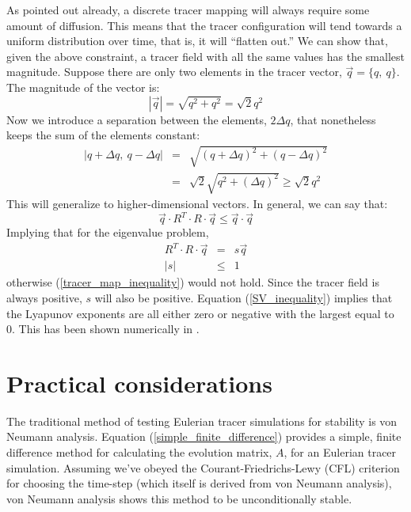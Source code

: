 \documentclass[11pt]{article}
\begin{document}
As pointed out already, a discrete tracer mapping will always require some 
amount of diffusion.  This means that the tracer configuration will 
tend towards a uniform distribution over time, 
that is, it will ``flatten out.''  We can
show that, given the above constraint, a tracer field with all the same values
 has the smallest magnitude.  Suppose there are only two elements in the 
tracer vector, $\vec q=\lbrace q,~q \rbrace$.  The magnitude of the vector is:
\begin{equation}
|\vec q|=\sqrt{q^2+q^2}=\sqrt{2} q^2
\end{equation}
Now we introduce a separation between the elements, $2\Delta q$, that 
nonetheless keeps the sum of the elements constant:
\begin{eqnarray}
|q+\Delta q,~q-\Delta q| & = & \sqrt{(q+\Delta q)^2+(q-\Delta q)^2} \\
& = & \sqrt{2}\sqrt{q^2+(\Delta q)^2} \ge \sqrt{2} q^2
\end{eqnarray}
This will generalize to higher-dimensional vectors.  In general, we can
say that:
\begin{equation}
\vec q \cdot R^T \cdot R \cdot \vec q \le \vec q \cdot \vec q
\label{tracer_map_inequality}
\end{equation}
Implying that for the eigenvalue problem,
\begin{eqnarray}
R^T \cdot R \cdot \vec q & = & s \vec q \nonumber\\
|s| & \le & 1 \label{SV_inequality}
\end{eqnarray}
otherwise (\ref{tracer_map_inequality}) would not hold.
Since the tracer field is always positive, $s$ will also be positive.
Equation (\ref{SV_inequality}) implies that the Lyapunov exponents are all
either zero or negative with the largest equal to 0.  This has been shown
numerically in \citet{Mills2012}.

\section{Practical considerations}

The traditional method of testing Eulerian tracer simulations for stability
is von Neumann analysis.
Equation (\ref{simple_finite_difference}) provides a simple, finite
difference method for
calculating the evolution matrix, $A$, for an Eulerian tracer simulation.
Assuming we've obeyed the Courant-Friedrichs-Lewy (CFL) criterion for choosing
the time-step (which itself is derived from von Neumann analysis), von Neumann
analysis shows this method to be unconditionally stable.
\end{document}
